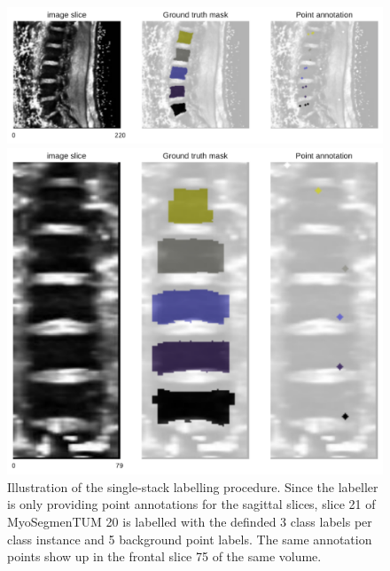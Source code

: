 \begin{figure}
    \centering
    \centering
    \begin{minipage}{.75\textwidth}
        \includegraphics[width=.99\textwidth]{images/MyoSegmenTUM020_s21_points.pdf}
    \end{minipage} 
    \vspace{1 mm}
    \begin{minipage}{.60\textwidth}
        \includegraphics[width=.99\textwidth]{images/MyoSegmenTUM020_s75_front_points.pdf}
    \end{minipage} 
    \vspace{2 mm}
    \caption{Illustration of the single-stack labelling procedure.
    Since the labeller is only providing point annotations for the sagittal slices, slice 21 of MyoSegmenTUM 20 is labelled with the definded 3 class labels per class instance and 5 background point labels.
    The same annotation points show up in the frontal slice 75 of the same volume. 
    \protect\label{fig:inferepoints_1}}
\end{figure}


